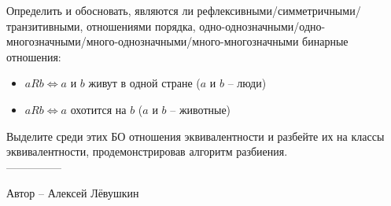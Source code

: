 \question
Определить и обосновать, являются ли рефлексивными/симметричными/транзитивными, отношениями порядка, одно-однозначными/одно-многозначными/много-однозначными/много-многозначными бинарные отношения:
\begin{itemize}
    \item $aRb \Leftrightarrow a$ и $b$ живут в одной стране ($a$ и $b$ -- люди)
    \item $aRb \Leftrightarrow a$ охотится на $b$ ($a$ и $b$ -- животные)
\end{itemize}

Выделите среди этих БО отношения эквивалентности и разбейте их на классы эквивалентности, продемонстрировав алгоритм разбиения.
\\
---------------

Автор -- Алексей Лёвушкин